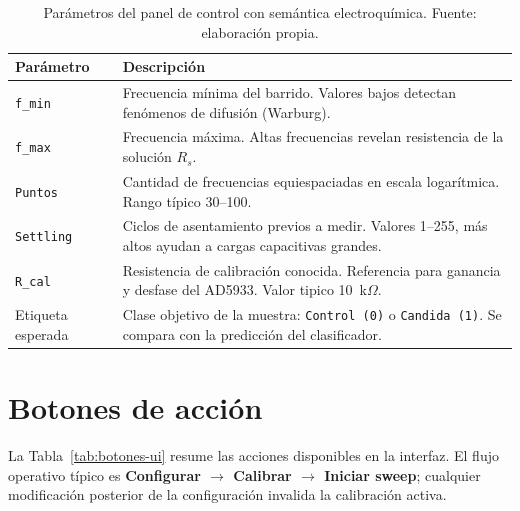 \documentclass[11pt,a4paper,spanish]{book}
\begin{document}
\begin{table}[ht]
	\centering
	\begin{tabular}{l p{10cm}}
		\hline\hline
		Par\'{a}metro      & Descripci\'{o}n                                                                                                                                             \\ [0.5ex]
		\hline
		\texttt{f\_min}    & Frecuencia m\'{i}nima del barrido. Valores bajos detectan fen\'{o}menos de difusi\'{o}n (Warburg).                                                          \\
		\texttt{f\_max}    & Frecuencia m\'{a}xima. Altas frecuencias revelan resistencia de la soluci\'{o}n $R_s$.                                                                      \\
		\texttt{Puntos}    & Cantidad de frecuencias equiespaciadas en escala logar\'{i}tmica. Rango t\'{i}pico 30--100.                                                                 \\
		\texttt{Settling}  & Ciclos de asentamiento previos a medir. Valores 1--255, m\'{a}s altos ayudan a cargas capacitivas grandes.                                                  \\
		\texttt{R\_cal}    & Resistencia de calibraci\'{o}n conocida. Referencia para ganancia y desfase del AD5933. Valor tipico 10~k$\Omega$.                                          \\
		Etiqueta esperada  & Clase objetivo de la muestra: \texttt{Control (0)} o \texttt{Candida (1)}. Se compara con la predicci\'{o}n del clasificador.                               \\
		\hline
	\end{tabular}
	\caption[Par\'{a}metros de configuraci\'{o}n de la UI]{Par\'{a}metros del panel de control con sem\'{a}ntica electroqu\'{i}mica. Fuente: elaboraci\'{o}n propia.}
	\label{tab:parametros-ui}
\end{table}

\section{Botones de acci\'{o}n}

La Tabla~\ref{tab:botones-ui} resume las acciones disponibles en la interfaz. El flujo operativo t\'{i}pico es \textbf{Configurar $\rightarrow$ Calibrar $\rightarrow$ Iniciar sweep}; cualquier modificaci\'{o}n posterior de la configuraci\'{o}n invalida la calibraci\'{o}n activa.
\end{document}
